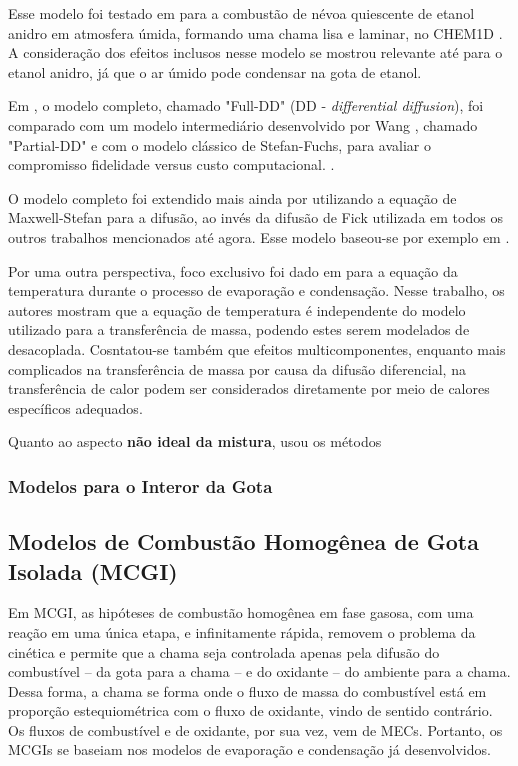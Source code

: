 Esse modelo foi testado em \cite{SacomanoF2024CF} para a combustão de névoa quiescente de etanol anidro em atmosfera úmida, formando uma chama lisa e laminar, no CHEM1D \cite{Sommers1994PhD}.
A consideração dos efeitos inclusos nesse modelo se mostrou relevante até para o etanol anidro, já que o ar úmido pode condensar na gota de etanol.

Em \cite{SacomanoF2025CF}, o modelo completo, chamado "Full-DD" (DD - \emph{differential diffusion}), foi comparado com um modelo intermediário desenvolvido por Wang \cite{WangC2013CF}, chamado "Partial-DD" e com o modelo clássico de Stefan-Fuchs, para avaliar o compromisso fidelidade versus custo computacional.
.

O modelo completo foi extendido mais ainda por \cite{SantosA2024IJHMT} utilizando a equação de Maxwell-Stefan para a difusão, ao invés da difusão de Fick utilizada em todos os outros trabalhos mencionados até agora.
Esse modelo baseou-se por exemplo em \cite{ToniniS2015IJTS}.

Por uma outra perspectiva, foco exclusivo foi dado em \cite{SantosA2023IJHMT} para a equação da temperatura durante o processo de evaporação e condensação.
Nesse trabalho, os autores mostram que a equação de temperatura é independente do modelo utilizado para a transferência de massa, podendo estes serem modelados de desacoplada.
Cosntatou-se também que efeitos multicomponentes, enquanto mais complicados na transferência de massa por causa da difusão diferencial, na transferência de calor podem ser considerados diretamente por meio de calores específicos adequados.

Quanto ao aspecto \textbf{não ideal da mistura}, \cite{SacomanoF2022IJHMT} usou os métodos 


\subsubsection{Modelos para o Interor da Gota} \label{sec:int}



\subsection{Modelos de Combustão Homogênea de Gota Isolada (MCGI)} \label{sec:MCGI}

Em MCGI, as hipóteses de combustão homogênea em fase gasosa, com uma reação em uma única etapa, e infinitamente rápida, removem o problema da cinética e permite que a chama seja controlada apenas pela difusão do combustível -- da gota para a chama -- e do oxidante -- do ambiente para a chama.
Dessa forma, a chama se forma onde o fluxo de massa do combustível está em proporção estequiométrica com o fluxo de oxidante, vindo de sentido contrário. 
Os fluxos de combustível e de oxidante, por sua vez, vem de MECs.
Portanto, os MCGIs se baseiam nos modelos de evaporação e condensação já desenvolvidos.

